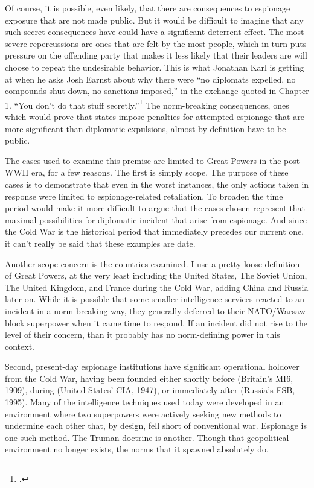 \documentclass[12pt]{article}
\begin{document}
Of course, it is possible, even likely, that there are consequences to espionage exposure that are not made public. But it would be difficult to imagine that any such secret consequences have could have a significant deterrent effect.  The most severe repercussions are ones that are felt by the most people, which in turn puts pressure on the offending party that makes it less likely that their leaders are will choose to repeat the undesirable behavior. This is what Jonathan Karl is getting at when he asks Josh Earnst about why there were ``no diplomats expelled, no compounds shut down, no sanctions imposed,'' in the exchange quoted in Chapter 1. ``You don't do that stuff secretly.''\footcite{earnest_press_2017} The norm-breaking consequences, ones which would prove that states impose penalties for attempted espionage that are more significant than diplomatic expulsions, almost by definition have to be public.


The cases used to examine this premise are limited to Great Powers in the post-WWII era, for a few reasons. The first is simply scope. The purpose of these cases is to demonstrate that even in the worst instances, the only actions taken in response were limited to espionage-related retaliation. To broaden the time period would make it more difficult to argue that the cases chosen represent that maximal possibilities for diplomatic incident that arise from espionage. And since the Cold War is the historical period that immediately precedes our current one, it can't really be said that these examples are date.

Another scope concern is the countries examined. I use a pretty loose definition of Great Powers, at the very least including the United States, The Soviet Union, The United Kingdom, and France during the Cold War, adding China and Russia later on. While it is possible that some smaller intelligence services reacted to an incident in a norm-breaking way, they generally deferred to their NATO/Warsaw block superpower when it came time to respond. If an incident did not rise to the level of their concern, than it probably has no norm-defining power in this context.

Second, present-day espionage institutions have significant operational holdover from the Cold War, having been founded either shortly before (Britain's MI6, 1909), during (United States' CIA, 1947), or immediately after (Russia's FSB, 1995). Many of the intelligence techniques used today were developed in an environment where two superpowers were actively seeking new methods to undermine each other that, by design, fell short of conventional war. Espionage is one such method. The Truman doctrine is another. Though that geopolitical environment no longer exists, the norms that it spawned absolutely do.
\end{document}
